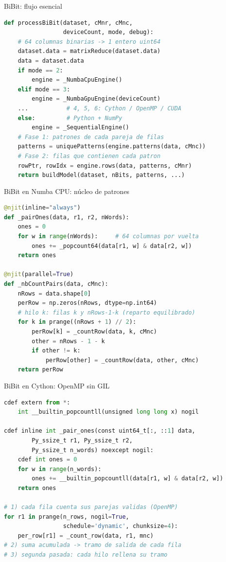 \documentclass[10pt,aspectratio=169]{beamer}
\makeatletter
\newcommand{\hlcheck}[1]{\color{backcolor}\@for\hl@n:=#1\do{\ifnum\value{lstnumber}=\hl@n\relax\color{hlcolor}\fi}}
\makeatother
\begin{document}
\begin{frame}[fragile]{BiBit: flujo esencial}
\begin{lstlisting}[language=Python,basicstyle=\ttfamily\footnotesize,linebackgroundcolor={\hlcheck{3,4,13,14,15,16}}]
def processBiBit(dataset, cMnr, cMnc,
                 deviceCount, mode, debug):
    # 64 columnas binarias -> 1 entero uint64
    dataset.data = matrixReduce(dataset.data)
    data = dataset.data
    if mode == 2:
        engine = _NumbaCpuEngine()
    elif mode == 3:
        engine = _NumbaGpuEngine(deviceCount)
    ...           # 4, 5, 6: Cython / OpenMP / CUDA
    else:         # Python + NumPy
        engine = _SequentialEngine()
    # Fase 1: patrones de cada pareja de filas
    patterns = uniquePatterns(engine.patterns(data, cMnc))
    # Fase 2: filas que contienen cada patron
    rowPtr, rowIdx = engine.rows(data, patterns, cMnr)
    return buildModel(dataset, nBits, patterns, ...)
\end{lstlisting}
\end{frame}

\begin{frame}[fragile]{BiBit en Numba CPU: núcleo de patrones}
\begin{lstlisting}[language=Python,basicstyle=\ttfamily\footnotesize,linebackgroundcolor={\hlcheck{5,8,12,13}}]
@njit(inline="always")
def _pairOnes(data, r1, r2, nWords):
    ones = 0
    for w in range(nWords):     # 64 columnas por vuelta
        ones += _popcount64(data[r1, w] & data[r2, w])
    return ones

@njit(parallel=True)
def _nbCountPairs(data, cMnc):
    nRows = data.shape[0]
    perRow = np.zeros(nRows, dtype=np.int64)
    # hilo k: filas k y nRows-1-k (reparto equilibrado)
    for k in prange((nRows + 1) // 2):
        perRow[k] = _countRow(data, k, cMnc)
        other = nRows - 1 - k
        if other != k:
            perRow[other] = _countRow(data, other, cMnc)
    return perRow
\end{lstlisting}
\end{frame}

\begin{frame}[fragile]{BiBit en Cython: OpenMP sin GIL}
\begin{lstlisting}[language=Python,basicstyle=\ttfamily\footnotesize,linebackgroundcolor={\hlcheck{2,6,9,13,14}}]
cdef extern from *:
    int __builtin_popcountll(unsigned long long x) nogil

cdef inline int _pair_ones(const uint64_t[:, ::1] data,
        Py_ssize_t r1, Py_ssize_t r2,
        Py_ssize_t n_words) noexcept nogil:
    cdef int ones = 0
    for w in range(n_words):
        ones += __builtin_popcountll(data[r1, w] & data[r2, w])
    return ones

# 1) cada fila cuenta sus parejas validas (OpenMP)
for r1 in prange(n_rows, nogil=True,
                 schedule='dynamic', chunksize=4):
    per_row[r1] = _count_row(data, r1, mnc)
# 2) suma acumulada -> tramo de salida de cada fila
# 3) segunda pasada: cada hilo rellena su tramo
\end{lstlisting}
\end{frame}
\end{document}
